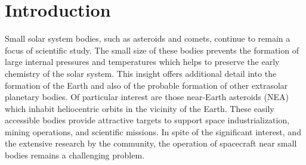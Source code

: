 \documentclass[journal]{new-aiaa}
\begin{document}




\section{Introduction}
Small solar system bodies, such as asteroids and comets, continue to remain a focus of scientific study.
The small size of these bodies prevents the formation of large internal pressures and temperatures which helps to preserve the early chemistry of the solar system.
This insight offers additional detail into the formation of the Earth and also of the probable formation of other extrasolar planetary bodies.
Of particular interest are those near-Earth asteroids (NEA) which inhabit heliocentric orbits in the vicinity of the Earth. 
These easily accessible bodies provide attractive targets to support space industrialization, mining operations, and scientific missions.
In spite of the significant interest, and the extensive research by the community, the operation of spacecraft near small bodies remains a challenging problem.
\end{document}
